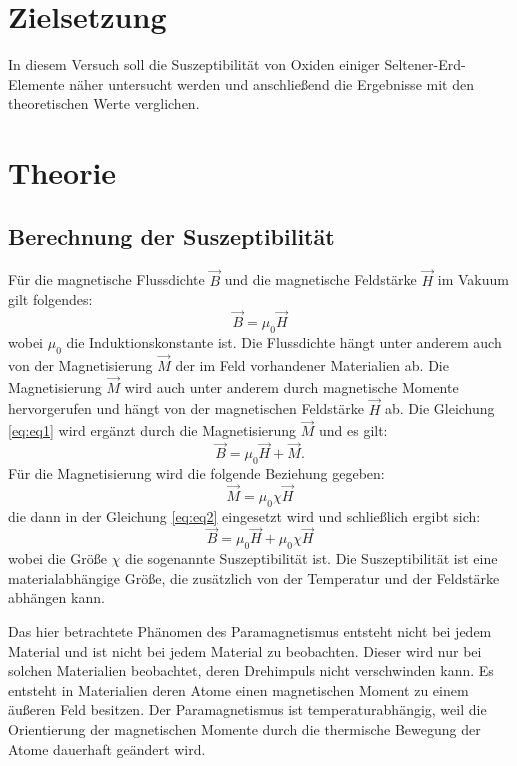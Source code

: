 \section{Zielsetzung}
\label{sec:Zielsetzung}

In diesem Versuch soll die Suszeptibilität von Oxiden einiger Seltener-Erd-Elemente näher untersucht werden und anschließend die Ergebnisse mit den theoretischen Werte verglichen.

\section{Theorie}
\label{sec:Theorie}
\subsection{Berechnung der Suszeptibilität}
\label{subsec: Berechnung}
Für die magnetische Flussdichte $\vec{B}$ und die magnetische Feldstärke $\vec{H}$ im Vakuum gilt folgendes:
\begin{equation}
\label{eq:eq1}
\vec{B} = \mu_0 \vec{H}
\end{equation}
wobei $\mu_0$ die Induktionskonstante ist. Die Flussdichte hängt unter anderem auch von der Magnetisierung $\vec{M}$ der im Feld vorhandener Materialien ab. Die Magnetisierung $\vec{M}$ wird auch unter anderem durch magnetische Momente hervorgerufen und hängt von der magnetischen Feldstärke $\vec{H}$ ab.
Die Gleichung \ref{eq:eq1} wird ergänzt durch die Magnetisierung $\vec{M}$ und es gilt:
\begin{equation}
\label{eq:eq2}
\vec{B} = \mu_0 \vec{H} + \vec{M}.
\end{equation}
Für die Magnetisierung wird die folgende Beziehung gegeben:
\begin{equation}
\vec{M} = \mu_0 \chi \vec{H}
\end{equation}
die dann in der Gleichung \ref{eq:eq2} eingesetzt wird und schließlich ergibt sich:
\begin{equation*}
\vec{B} = \mu_0 \vec{H} + \mu_0 \chi \vec{H}
\end{equation*}
wobei die Größe $\chi$ die sogenannte Suszeptibilität ist. Die Suszeptibilität ist eine materialabhängige Größe, die zusätzlich von der Temperatur und der Feldstärke abhängen kann. 

Das hier betrachtete Phänomen des Paramagnetismus entsteht nicht bei jedem Material und ist nicht bei jedem Material zu beobachten. Dieser wird nur bei solchen Materialien beobachtet, deren Drehimpuls nicht verschwinden kann. Es entsteht in Materialien deren Atome einen magnetischen Moment zu einem äußeren Feld besitzen. Der Paramagnetismus ist temperaturabhängig, weil die Orientierung der magnetischen Momente durch die thermische Bewegung der Atome dauerhaft geändert wird.

